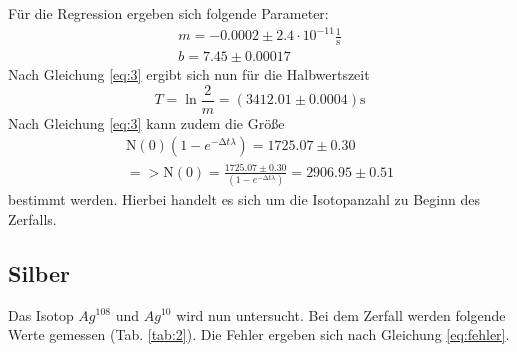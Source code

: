 Für die Regression ergeben sich folgende Parameter:
\begin{gather*}
	m = -0.0002\pm 2.4\cdot10^{-11} \frac{1}{\text{s}}\\
	b = 7.45\pm0.00017
\end{gather*}
Nach Gleichung \ref{eq:3} ergibt sich nun für die Halbwertszeit
\begin{equation}
	T = \ln{\frac{2}{m}} = (3412.01 \pm 0.0004) \text{s}
\end{equation}
Nach Gleichung \ref{eq:3} kann zudem die Größe
\begin{gather*}
	\text{N}(0)(1-e^{-\increment t\lambda}) = 1725.07 \pm 0.30 \\
	=> \text{N}(0) = \frac{1725.07 \pm 0.30}{(1-e^{-\increment t\lambda})} = 2906.95 \pm 0.51
\end{gather*} 
bestimmt werden. Hierbei handelt es sich um die Isotopanzahl zu Beginn des Zerfalls.

\subsection{Silber}
Das Isotop $Ag^{108}$ und $Ag^{10}$ wird nun untersucht. Bei dem Zerfall werden folgende Werte gemessen (Tab. \ref{tab:2}).
Die Fehler ergeben sich nach Gleichung \ref{eq:fehler}.

